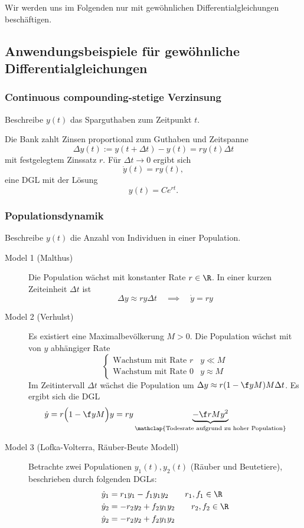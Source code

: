 \documentclass[
]{mycourse}
\begin{document}
Wir werden uns im Folgenden nur mit gewöhnlichen Differentialgleichungen beschäftigen.

\subsection{Anwendungsbeispiele für gewöhnliche Differentialgleichungen}

\subsubsection{Continuous compounding-stetige Verzinsung}

Beschreibe $y(t)$ das Sparguthaben zum Zeitpunkt $t$.


Die Bank zahlt Zinsen proportional zum Guthaben und Zeitspanne
\[
	\Delta y(t) := y(t + \Delta t) - y(t) = r y(t) \Delta t
\]
mit festgelegtem Zinssatz $r$.
Für $\Delta t \to 0$ ergibt sich
\[
	\dot y (t) = ry(t),
\]
eine DGL mit der Lösung
\[
	y(t) = Ce^{rt}.
\]

\subsubsection{Populationsdynamik}

Beschreibe $y(t)$ die Anzahl von Individuen in einer Population.

\begin{description}
	\item[Model 1 (Malthus)]
		Die Population wächst mit konstanter Rate $r \in \R$.
		In einer kurzen Zeiteinheit $\Delta t$ ist
		\[
			\Delta y \approx ry \Delta t
			\quad \implies \quad
			\dot y = r y
		\]
	\item[Model 2 (Verhulst)]
		Es existiert eine Maximalbevölkerung $M > 0$.
		Die Population wächst mit von $y$ abhängiger Rate
		\[
			\begin{cases}
				\text{Wachstum mit Rate $r$} & y \ll M \\
				\text{Wachstum mit Rate $0$} & y \approx M
			\end{cases}
		\]
		Im Zeitintervall $\Delta t$ wächst die Population um $\Delta y \approx r(1-\f yM) M \Delta t$.
		Es ergibt sich die DGL
		\[
			\dot y = r \Big(1 - \f yM\Big) y = ry \underbrace{- \f rM y^2}_{\mathclap{\text{Todesrate aufgrund zu hoher Population}}}
		\]
	\item[Model 3 (Lofka-Volterra, Räuber-Beute Modell)]
		Betrachte zwei Populationen $y_1(t), y_2(t)$ (Räuber und Beutetiere), beschrieben durch folgenden DGLs:
		\begin{align*}
			\dot y_1 &= r_1 y_1 - f_1y_1y_2
			\qquad r_1,f_1 \in \R \\
			\dot y_2 &= -r_2 y_2 + f_2 y_1y_2
			\qquad r_2,f_2 \in \R \\
			\dot y_2 &= -r_2 y_2 + f_2 y_1y_2
		\end{align*}
\end{description}
\end{document}
